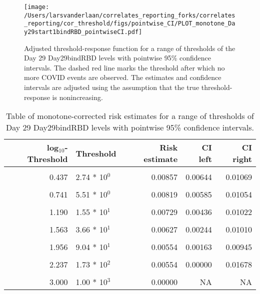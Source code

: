 \documentclass[]{article}
\begin{document}
\begin{figure}[H]
\centering
\texttt{[image: /Users/larsvanderlaan/correlates\_reporting\_forks/correlates\_reporting/cor\_threshold/figs/pointwise\_CI/PLOT\_monotone\_Day29start1bindRBD\_pointwiseCI.pdf]}
\caption{Adjusted threshold-response function for a range of thresholds of the
  Day 29 Day29bindRBD levels with pointwise 95\% confidence intervals. The dashed red line marks the threshold after which no more COVID events are observed. The estimates and confidence intervals are adjusted using the assumption that the true threshold-response is nonincreasing.}
\end{figure}
\begin{table}[!h]

\caption{\label{tab:unnamed-chunk-38}Table of monotone-corrected risk estimates for a range of thresholds of Day 29 Day29bindRBD levels with pointwise 95\% confidence intervals.}
\centering
\begin{tabular}[t]{rlrrr}
\toprule
log$_{10}$-Threshold & Threshold & Risk estimate & CI left & CI right\\
\midrule
\cellcolor{gray!6}{-0.099} & \cellcolor{gray!6}{7.96 * 10$^{1}$} & \cellcolor{gray!6}{0.00876} & \cellcolor{gray!6}{0.00674} & \cellcolor{gray!6}{0.01078}\\
0.437 & 2.74 * 10$^{0}$ & 0.00857 & 0.00644 & 0.01069\\
\cellcolor{gray!6}{0.585} & \cellcolor{gray!6}{3.85 * 10$^{0}$} & \cellcolor{gray!6}{0.00857} & \cellcolor{gray!6}{0.00630} & \cellcolor{gray!6}{0.01083}\\
0.741 & 5.51 * 10$^{0}$ & 0.00819 & 0.00585 & 0.01054\\
\cellcolor{gray!6}{1.000} & \cellcolor{gray!6}{1.00 * 10$^{1}$} & \cellcolor{gray!6}{0.00788} & \cellcolor{gray!6}{0.00543} & \cellcolor{gray!6}{0.01033}\\
1.190 & 1.55 * 10$^{1}$ & 0.00729 & 0.00436 & 0.01022\\
\cellcolor{gray!6}{1.371} & \cellcolor{gray!6}{2.35 * 10$^{1}$} & \cellcolor{gray!6}{0.00671} & \cellcolor{gray!6}{0.00343} & \cellcolor{gray!6}{0.00998}\\
1.563 & 3.66 * 10$^{1}$ & 0.00627 & 0.00244 & 0.01010\\
\cellcolor{gray!6}{1.852} & \cellcolor{gray!6}{7.11 * 10$^{1}$} & \cellcolor{gray!6}{0.00621} & \cellcolor{gray!6}{0.00179} & \cellcolor{gray!6}{0.01063}\\
1.956 & 9.04 * 10$^{1}$ & 0.00554 & 0.00163 & 0.00945\\
\cellcolor{gray!6}{2.083} & \cellcolor{gray!6}{1.21 * 10$^{2}$} & \cellcolor{gray!6}{0.00554} & \cellcolor{gray!6}{0.00000} & \cellcolor{gray!6}{0.01678}\\
2.237 & 1.73 * 10$^{2}$ & 0.00554 & 0.00000 & 0.01678\\
\cellcolor{gray!6}{2.699} & \cellcolor{gray!6}{5.00 * 10$^{2}$} & \cellcolor{gray!6}{0.00000} & \cellcolor{gray!6}{NA} & \cellcolor{gray!6}{NA}\\
3.000 & 1.00 * 10$^{3}$ & 0.00000 & NA & NA\\
\bottomrule
\end{tabular}
\end{table}
\end{document}
